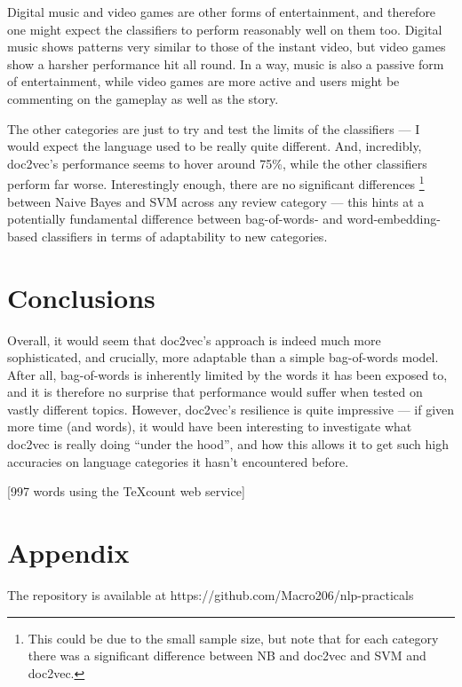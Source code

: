 \documentclass[12pt,a4paper,twoside]{article}
\begin{document}
Digital music and video games are other forms of entertainment, and therefore one might expect the classifiers to perform reasonably well on them too. Digital music shows patterns very similar to those of the instant video, but video games show a harsher performance hit all round. In a way, music is also a passive form of entertainment, while video games are more active and users might be commenting on the gameplay as well as the story.

The other categories are just to try and test the limits of the classifiers --- I would expect the language used to be really quite different. And, incredibly, doc2vec's performance seems to hover around 75\%, while the other classifiers perform far worse. Interestingly enough, there are no significant differences \footnote{This could be due to the small sample size, but note that for each category there was a significant difference between NB and doc2vec and SVM and doc2vec.} between Naive Bayes and SVM across any review category --- this hints at a potentially fundamental difference between bag-of-words- and word-embedding-based classifiers in terms of adaptability to new categories.


\section{Conclusions}

Overall, it would seem that doc2vec's approach is indeed much more sophisticated, and crucially, more adaptable than a simple bag-of-words model. After all, bag-of-words is inherently limited by the words it has been exposed to, and it is therefore no surprise that performance would suffer when tested on vastly different topics. However, doc2vec's resilience is quite impressive --- if given more time (and words), it would have been interesting to investigate what doc2vec is really doing ``under the hood'', and how this allows it to get such high accuracies on language categories it hasn't encountered before.

\vspace{16px}

[997 words using the TeXcount web service]

\section{Appendix}

The repository is available at https://github.com/Macro206/nlp-practicals
\end{document}
